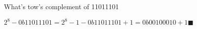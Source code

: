 \documentclass{article}
\begin{document}
What's tow's complement of 11011101

$2^8 - 0b11011101 = 2^8 - 1 - 0b11011101 + 1 = 0b00100010 + 1\blacksquare$
\end{document}

